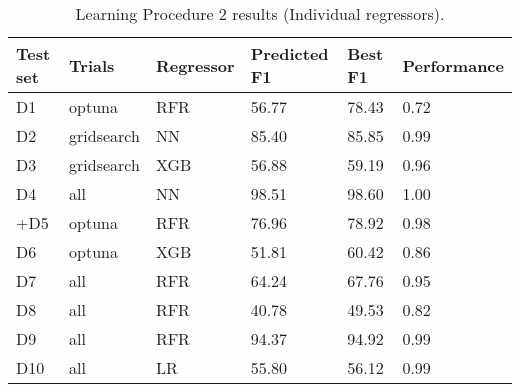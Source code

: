 \begin{table}[t]
{\footnotesize
\begin{center}  
\caption{Learning Procedure 2 results (Individual regressors).}
\label{tab:sklearn-nn-results}
\begin{tabular}{|p{0.5cm}|l|p{1.2cm}|p{1.2cm}|p{1cm}|l|}
\hline
\textbf{Test set} & \textbf{Trials} & \textbf{Regressor} & \textbf{Predicted F1} & \textbf{Best F1} & \textbf{Performance} \\
\hline
D1 & optuna & RFR & 56.77 & 78.43 & 0.72 \\
D2 & gridsearch & NN & 85.40 & 85.85 & 0.99 \\
D3 & gridsearch & XGB & 56.88 & 59.19 & 0.96 \\
D4 & all & NN & 98.51 & 98.60 & 1.00 \\
+D5 & optuna & RFR & 76.96 & 78.92 & 0.98 \\
D6 & optuna & XGB & 51.81 & 60.42 & 0.86 \\
D7 & all & RFR & 64.24 & 67.76 & 0.95 \\
D8 & all & RFR & 40.78 & 49.53 & 0.82 \\
D9 & all & RFR & 94.37 & 94.92 & 0.99 \\
D10 & all & LR & 55.80 & 56.12 & 0.99 \\
\bottomrule
\end{tabular}
\end{center}  
}
\end{table}